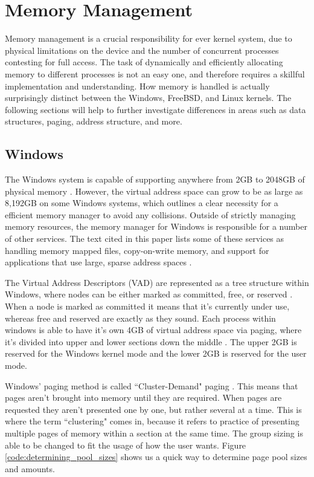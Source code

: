\documentclass[10pt,draftclsnofoot,onecolumn]{IEEEtran}
\begin{document}
\section{Memory Management}
\label{sec:Memory Management}
\par Memory management is a crucial responsibility for ever kernel system, due to physical limitations on the device and the number of concurrent processes contesting for full access.
The task of dynamically and efficiently allocating memory to different processes is not an easy one, and therefore requires a skillful implementation and understanding.
How memory is handled is actually surprisingly distinct between the Windows, FreeBSD, and Linux kernels.
The following sections will help to further investigate differences in areas such as data structures, paging, address structure, and more.

\subsection{Windows}
\label{sub:Memory Management Windows}
\par The Windows system is capable of supporting anywhere from 2GB to 2048GB of physical memory \cite{win:2}.
However, the virtual address space can grow to be as large as 8,192GB on some Windows systems, which outlines a clear necessity for a efficient memory manager to avoid any collisions.
Outside of strictly managing memory resources, the memory manager for Windows is responsible for a number of other services.
The text cited in this paper lists some of these services as handling memory mapped files, copy-on-write memory, and support for applications that use large, sparse address spaces \cite{win:2}.

\par The Virtual Address Descriptors (VAD) are represented as a tree structure within Windows, where nodes can be either marked as committed, free, or reserved \cite{win:2}.
When a node is marked as committed it means that it's currently under use, whereas free and reserved are exactly as they sound.
Each process within windows is able to have it's own 4GB of virtual address space via paging, where it's divided into upper and lower sections down the middle \cite{win:2}.
The upper 2GB is reserved for the Windows kernel mode and the lower 2GB is reserved for the user mode.

\par Windows' paging method is called ``Cluster-Demand" paging \cite{win:2}.
This means that pages aren't brought into memory until they are required.
When pages are requested they aren't presented one by one, but rather several at a time.
This is where the term ``clustering" comes in, because it refers to practice of presenting multiple pages of memory within a section at the same time.
The group sizing is able to be changed to fit the usage of how the user wants.
Figure \ref{code:determining_pool_sizes} shows us a quick way to determine page pool sizes and amounts.
\end{document}
